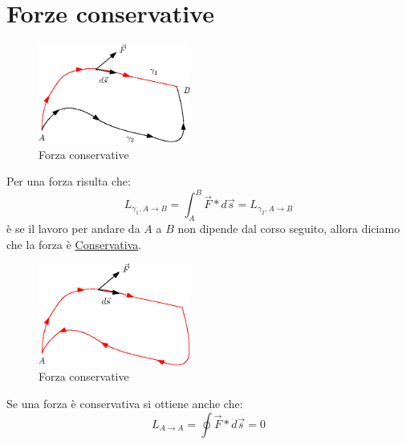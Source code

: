 \section{Forze conservative}
\begin{figure}[th]
    \centering
    \includegraphics[width=5cm]{img/finiti/forza_conservativa.eps}
    \caption{Forza conservative}
\end{figure}
Per una forza risulta che:
\begin{equation}
  L_{\gamma_1,A\to B}=\int_A^B \vec{F}*d\vec{s}=L_{\gamma_2,A\to B}
\end{equation}
è se il lavoro per andare da $A$ a $B$ non dipende dal corso seguito, allora diciamo che
la forza è \underline{Conservativa}.
\begin{figure}[th]
    \centering
    \includegraphics[width=5cm]{img/finiti/forza_conservativa_2.eps}
    \caption{Forza conservative}
\end{figure}
Se una forza è conservativa si ottiene anche che:
\begin{equation}
  L_{A\to A} =\oint \vec{F}*d\vec{s}=0
\end{equation}
